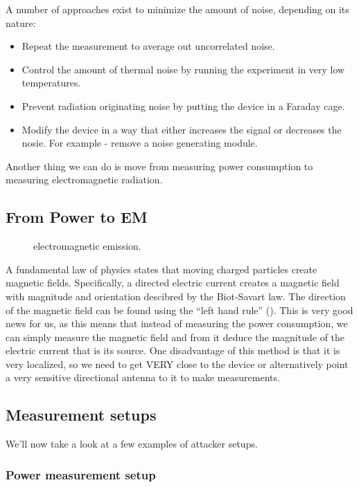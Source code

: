 A number of approaches exist to minimize the amount of noise, depending on its nature:
\begin{itemize}
    \item Repeat the measurement to average out uncorrelated noise.
    \item Control the amount of thermal noise by running the experiment in very low temperatures.
    \item Prevent radiation originating noise by putting the device in a Faraday cage.
    \item Modify the device in a way that either increases the signal or decreases the nosie. For example - remove a noise generating module.
\end{itemize}

Another thing we can do is move from measuring power consumption to measuring electromagnetic radiation.

\subsection {From Power to EM}

\begin{figure}[!ht]
    \centering
    
    \caption{electromagnetic emission.} \label{fig:electromagnetic emission}
\end{figure}

A fundamental law of physics states that moving charged particles create magnetic fields. Specifically, a directed electric current creates a magnetic field with magnitude and orientation descibred by the Biot-Savart law. The direction of the magnetic field can be found using the ``left hand rule'' (). This is very good news for us, as this means that instead of measuring the power consumption, we can simply measure the magnetic field and from it deduce the magnitude of the electric current that is its source.
One disadvantage of this method is that it is very localized, so we need to get VERY close to the device or alternatively point a very sensitive directional antenna to it to make measurements.

\subsection{Measurement setups}
We'll now take a look at a few examples of attacker setups.

\subsubsection{Power measurement setup}

